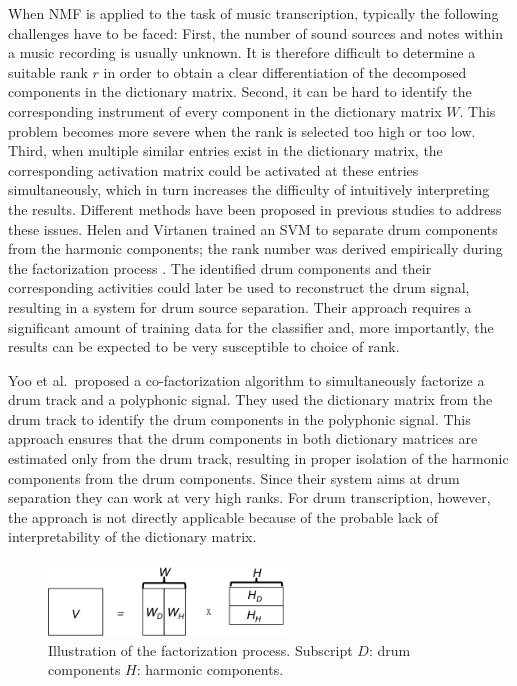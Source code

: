 \documentclass{article}
\begin{document}
When NMF is applied to the task of music transcription, typically the following challenges have to be faced:
First, the number of sound sources and notes within a music recording is usually unknown. It is therefore difficult to determine a suitable rank $r$ in order to obtain a clear differentiation of the decomposed components in the dictionary matrix. 
Second, it can be  hard to identify the corresponding instrument of every component in the dictionary matrix $W$. This problem becomes more severe when the rank is selected too high or too low. 
Third, when multiple similar entries exist in the dictionary matrix, the corresponding activation matrix could be activated at these entries simultaneously, which in turn increases the difficulty of intuitively interpreting the results. %
Different methods have been proposed in previous studies to address these issues. Helen and Virtanen trained an SVM to separate drum components from the harmonic components; the rank number was derived empirically during the factorization process \cite{helen_separation_2005}. The identified drum components and their corresponding activities could later be used to reconstruct the drum signal, resulting in a system for drum source separation. Their approach requires a significant amount of training data for the classifier and, more importantly, the results can be expected to be very susceptible to choice of rank. %

Yoo et al.\ proposed a co-factorization algorithm \cite{yoo_nonnegative_2010} to simultaneously factorize a drum track and a polyphonic signal. They used the dictionary matrix from the drum track to identify the drum components in the polyphonic signal. This approach ensures that the drum components in both dictionary matrices are estimated only from the drum track, resulting in proper isolation of the harmonic components from the drum components. Since their system aims at drum separation they can work at very high ranks. For drum transcription, however, the approach is not directly applicable because of the probable lack of interpretability of the dictionary matrix.
\begin{figure}
 \centering 
  \centerline{
 \includegraphics[width=6.5cm]{factorization_small.png}}
 \caption{Illustration of the factorization process. Subscript $D$: drum components $H$: harmonic components.}
 \label{fig:factorization}
\end{figure}
\end{document}
